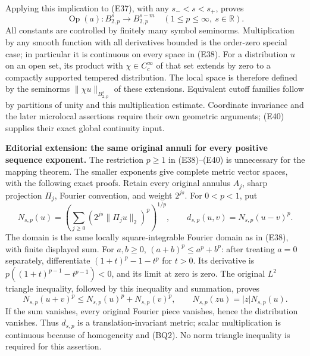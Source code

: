 \documentclass[
  11pt,
]{article}
\begin{document}
Applying this implication to (E37), with any \(s_-<s<s_+\), proves \[
\operatorname{Op}(a):B^s_{2,p}\longrightarrow B^{s-m}_{2,p}
\quad(1\leq p\leq\infty,\ s\in\mathbb R).
\tag{E40}
\] All constants are controlled by finitely many symbol seminorms.
Multiplication by any smooth function with all derivatives bounded is
the order-zero special case; in particular it is continuous on every
space in (E38). For a distribution \(u\) on an open set, its product
with \(\chi\in C_c^\infty\) of that set extends by zero to a compactly
supported tempered distribution. The local space is therefore defined by
the seminorms \(\|\chi u\|_{B^s_{2,p}}\) of these extensions. Equivalent
cutoff families follow by partitions of unity and this multiplication
estimate. Coordinate invariance and the later microlocal assertions
require their own geometric arguments; (E40) supplies their exact global
continuity input.

\textbf{Editorial extension: the same original annuli for every positive
sequence exponent.} The restriction \(p\ge1\) in (E38)--(E40) is
unnecessary for the mapping theorem. The smaller exponents give complete
metric vector spaces, with the following exact proofs. Retain every
original annulus \(A_j\), sharp projection \(\Pi_j\), Fourier
convention, and weight \(2^{js}\). For \(0<p<1\), put \[
N_{s,p}(u)=\left(\sum_{j\ge0}(2^{js}\|\Pi_ju\|_2)^p\right)^{1/p},
\qquad d_{s,p}(u,v)=N_{s,p}(u-v)^p.
\tag{BQ1}
\] The domain is the same locally square-integrable Fourier domain as in
(E38), with finite displayed sum. For \(a,b\ge0\),
\((a+b)^p\le a^p+b^p\): after treating \(a=0\) separately, differentiate
\((1+t)^p-1-t^p\) for \(t>0\). Its derivative is
\(p((1+t)^{p-1}-t^{p-1})<0\), and its limit at zero is zero. The
original \(L^2\) triangle inequality, followed by this inequality and
summation, proves \[
N_{s,p}(u+v)^p\le N_{s,p}(u)^p+N_{s,p}(v)^p,
\qquad N_{s,p}(zu)=|z|N_{s,p}(u).
\tag{BQ2}
\] If the sum vanishes, every original Fourier piece vanishes, hence the
distribution vanishes. Thus \(d_{s,p}\) is a translation-invariant
metric; scalar multiplication is continuous because of homogeneity and
(BQ2). No norm triangle inequality is required for this assertion.
\end{document}
